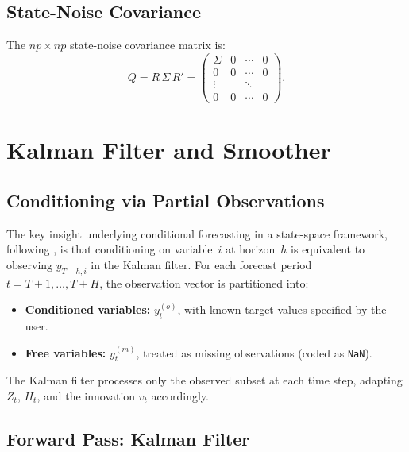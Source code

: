 \documentclass[11pt]{article}
\theoremstyle{definition}
\theoremstyle{remark}
\begin{document}
\subsection{State-Noise Covariance}

The $np \times np$ state-noise covariance matrix is:
\begin{equation}\label{eq:Q}
  Q = R\, \Sigma\, R' = \begin{pmatrix}
    \Sigma & 0 & \cdots & 0 \\
    0      & 0 & \cdots & 0 \\
    \vdots & & \ddots & \\
    0      & 0 & \cdots & 0
  \end{pmatrix}.
\end{equation}


\section{Kalman Filter and Smoother}\label{sec:kalman}

\subsection{Conditioning via Partial Observations}\label{sec:partial}

The key insight underlying conditional forecasting in a state-space
framework, following \citet{BanburaGiannoneLenza2015}, is that
conditioning on variable~$i$ at horizon~$h$ is equivalent to observing
$y_{T+h,i}$ in the Kalman filter.  For each forecast period
$t = T+1, \ldots, T+H$, the observation vector is partitioned into:
\begin{itemize}
  \item \textbf{Conditioned variables:} $y_t^{(o)}$, with known
    target values specified by the user.
  \item \textbf{Free variables:} $y_t^{(m)}$, treated as missing
    observations (coded as \texttt{NaN}).
\end{itemize}
The Kalman filter processes only the observed subset at each time
step, adapting $Z_t$, $H_t$, and the innovation $v_t$ accordingly.

\subsection{Forward Pass: Kalman Filter}\label{sec:kf}
\end{document}
